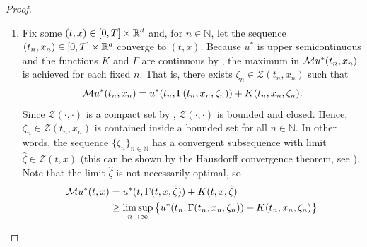 \begin{proof}
\begin{enumerate}[label=(\roman*)]
        For the second assertion in $(i)$, we begin by noting that 
        \begin{equation*}
            \InterveneOper u(t,x) \geq \InterveneOper u_*(t,x) \quad \text{for all } (t,x) \in [0,T] \times \R^d,
        \end{equation*}
        because $u \geq u_*$ by Definition \ref{def: lower semi-continuous functions}. Thus, for any $(t,x) \in [0,T] \times \R^d$
        \begin{align*}
            (\InterveneOper u(t,x))_* & \geq (\InterveneOper u_*(t,x))_* \\
            &= \Big( \sup_{\zeta \in \mathcal{Z}(t,x)} \big\{ u_*(t,\Gamma(t,x,\zeta)) + K(t,x,\zeta) \big\} \Big)_* \\
            &= \sup_{\zeta \in \mathcal{Z}(t,x)} \big\{ u_*(t,x\Gamma(t,x,\zeta)) + K(t,x,\zeta) \big\} \\
            &= \InterveneOper u_*(t,x),
        \end{align*}
        as $K$ is continuous by .
    \item Fix some $(t,x) \in [0,T] \times \R^d$ and, for $n \in \mathbb N$, let the sequence $(t_n,x_n) \in [0,T] \times \mathbb{R}^d$ converge to $(t,x)$. Because $u^*$ is upper semicontinuous and the functions $K$ and $\Gamma$ are continuous by , the maximum in $\mathcal{M} u^*(t_n,x_n)$ is achieved for each fixed $n$. That is, there exists $\zeta_n \in \mathcal{Z}(t_n,x_n)$ such that 
    \begin{equation*}
        \mathcal{M} u^*(t_n,x_n) = u^*(t_n, \Gamma(t_n,x_n,\zeta_n)) + K(t_n,x_n,\zeta_n).
    \end{equation*}
    Since $\mathcal{Z}(\cdot,\cdot)$ is a compact set by , $\mathcal{Z}(\cdot,\cdot)$ is bounded and closed. Hence, $\zeta_n \in \mathcal{Z}(t_n,x_n)$ is contained inside a bounded set for all $n\in \mathbb N$. In other words, the sequence $\{\zeta_n\}_{n\in \mathbb N}$ has a convergent subsequence with limit $\hat{\zeta} \in \mathcal{Z}(t,x)$ (this can be shown by the Hausdorff convergence theorem, see {\cite[Chapter 7]{burago2001course}}). Note that the limit $\hat{\zeta}$ is not necessarily optimal, so
    \begin{align*}
        \InterveneOper u^*(t,x) &= u^*(t,\Gamma(t,x,\hat{\zeta})) + K(t,x,\hat{\zeta}) \\
        & \geq \limsup_{n \rightarrow \infty} \big\{ u^*(t_n,\Gamma(t_n,x_n,\zeta_n)) + K(t_n,x_n,\zeta_n) \big\} \\

\end{align*}
\end{enumerate}
\end{proof}
